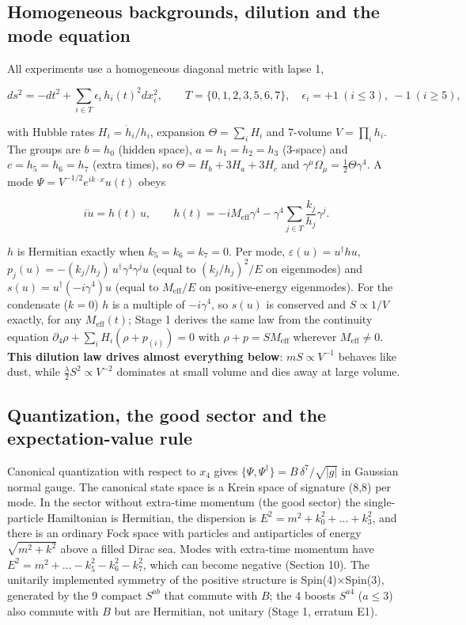 \documentclass[11pt]{article}
\begin{document}
\subsection{Homogeneous backgrounds, dilution and the mode equation}

All experiments use a homogeneous diagonal metric with lapse 1,

\[
ds^2=-dt^2+\sum_{i\in T}\epsilon_i\,h_i(t)^2dx_i^2,\qquad T=\{0,1,2,3,5,6,7\},\quad \epsilon_i=+1\ (i\le3),\ -1\ (i\ge5),
\]

with Hubble rates $H_i=\dot h_i/h_i$, expansion $\Theta=\sum_iH_i$ and 7-volume $V=\prod_ih_i$. The groups are $b=h_0$ (hidden space), $a=h_1=h_2=h_3$ (3-space) and $c=h_5=h_6=h_7$ (extra times), so $\Theta=H_b+3H_a+3H_c$ and $\gamma^\mu\Omega_\mu=\tfrac12\Theta\gamma^4$. A mode $\Psi=V^{-1/2}e^{ik\cdot x}u(t)$ obeys

\[
i\dot u=h(t)\,u,\qquad h(t)=-iM_{\mathrm{eff}}\gamma^4-\gamma^4\sum_{j\in T}\frac{k_j}{h_j}\gamma^j .
\]

$h$ is Hermitian exactly when $k_5=k_6=k_7=0$. Per mode, $\varepsilon(u)=u^\dagger hu$, $p_j(u)=-(k_j/h_j)\,u^\dagger\gamma^4\gamma^ju$ (equal to $(k_j/h_j)^2/E$ on eigenmodes) and $s(u)=u^\dagger(-i\gamma^4)u$ (equal to $M_{\mathrm{eff}}/E$ on positive-energy eigenmodes). For the condensate ($k=0$) $h$ is a multiple of $-i\gamma^4$, so $s(u)$ is conserved and $S\propto1/V$ exactly, for any $M_{\mathrm{eff}}(t)$; Stage 1 derives the same law from the continuity equation $\partial_4\rho+\sum_iH_i(\rho+p_{(i)})=0$ with $\rho+p=SM_{\mathrm{eff}}$ wherever $M_{\mathrm{eff}}\ne0$. \textbf{This dilution law drives almost everything below}: $mS\propto V^{-1}$ behaves like dust, while $\tfrac\lambda2S^2\propto V^{-2}$ dominates at small volume and dies away at large volume.

\subsection{Quantization, the good sector and the expectation-value rule}

Canonical quantization with respect to $x_4$ gives $\{\Psi,\Psi^\dagger\}=B\,\delta^7/\sqrt{|g|}$ in Gaussian normal gauge. The canonical state space is a Krein space of signature (8,8) per mode. In the sector without extra-time momentum (the good sector) the single-particle Hamiltonian is Hermitian, the dispersion is $E^2=m^2+k_0^2+\dots+k_3^2$, and there is an ordinary Fock space with particles and antiparticles of energy $\sqrt{m^2+k^2}$ above a filled Dirac sea. Modes with extra-time momentum have $E^2=m^2+\dots-k_5^2-k_6^2-k_7^2$, which can become negative (Section 10). The unitarily implemented symmetry of the positive structure is Spin(4)$\times$Spin(3), generated by the 9 compact $S^{ab}$ that commute with $B$; the 4 boosts $S^{a4}$ ($a\le3$) also commute with $B$ but are Hermitian, not unitary (Stage 1, erratum E1).
\end{document}
